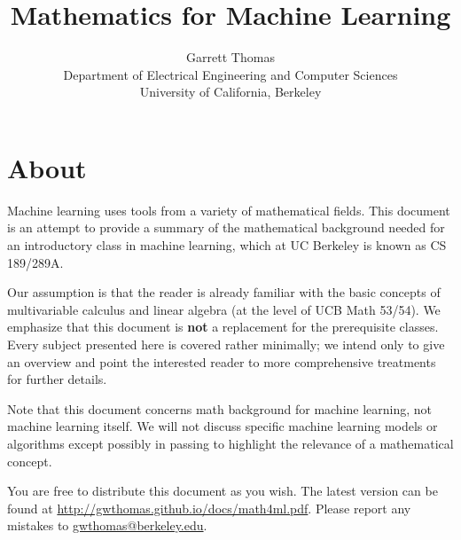 \documentclass{article}
\title{Mathematics for Machine Learning}
\author{Garrett Thomas\\
Department of Electrical Engineering and Computer Sciences\\
University of California, Berkeley}
\begin{document}
\maketitle

\section{About}
Machine learning uses tools from a variety of mathematical fields.
This document is an attempt to provide a summary of the mathematical background needed for an introductory class in machine learning, which at UC Berkeley is known as CS 189/289A.

Our assumption is that the reader is already familiar with the basic concepts of multivariable calculus and linear algebra (at the level of UCB Math 53/54).
We emphasize that this document is \textbf{not} a replacement for the prerequisite classes.
Every subject presented here is covered rather minimally; we intend only to give an overview and point the interested reader to more comprehensive treatments for further details.

Note that this document concerns math background for machine learning, not machine learning itself.
We will not discuss specific machine learning models or algorithms except possibly in passing to highlight the relevance of a mathematical concept.

You are free to distribute this document as you wish.
The latest version can be found at \url{http://gwthomas.github.io/docs/math4ml.pdf}.
Please report any mistakes to \url{gwthomas@berkeley.edu}.

\newpage
\tableofcontents

\newpage
\end{document}
